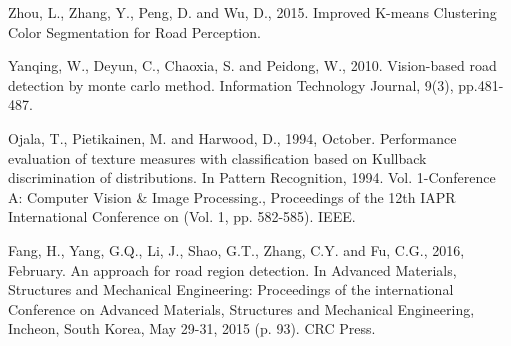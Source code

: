 \documentclass[oneside,english]{llncs}
\begin{document}
\begin{thebibliography}{1}
Zhou, L., Zhang, Y., Peng, D. and Wu, D., 2015. Improved K-means Clustering Color Segmentation for Road Perception.

Yanqing, W., Deyun, C., Chaoxia, S. and Peidong, W., 2010. Vision-based road detection by monte carlo method. Information Technology Journal, 9(3), pp.481-487.

Ojala, T., Pietikainen, M. and Harwood, D., 1994, October. Performance evaluation of texture measures with classification based on Kullback discrimination of distributions. In Pattern Recognition, 1994. Vol. 1-Conference A: Computer Vision \& Image Processing., Proceedings of the 12th IAPR International Conference on (Vol. 1, pp. 582-585). IEEE.

Fang, H., Yang, G.Q., Li, J., Shao, G.T., Zhang, C.Y. and Fu, C.G., 2016, February. An approach for road region detection. In Advanced Materials, Structures and Mechanical Engineering: Proceedings of the international Conference on Advanced Materials, Structures and Mechanical Engineering, Incheon, South Korea, May 29-31, 2015 (p. 93). CRC Press.

\end{thebibliography}
\end{document}
